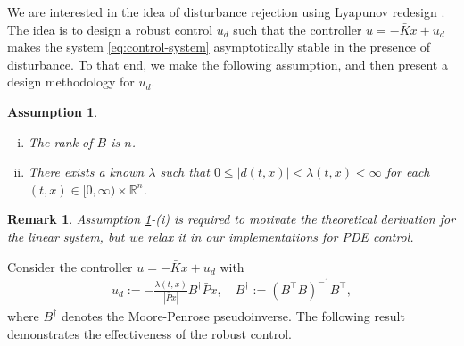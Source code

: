 \documentclass[10pt,a4paper]{amsart}
\newtheorem{assumption}{Assumption}
\newtheorem{remark}{Remark}
\newcommand{\tp}{^\top}
\newcommand{\inv}{^{-1}}
\newcommand{\R}{\mathbb{R}}
\newcommand{\ip}[2]{\langle #1, #2 \rangle}
\newcommand{\todo}[1]{{\color{blue} #1}}
\begin{document}
We are interested in the idea of disturbance rejection using Lyapunov redesign \cite[Chapter 14]{khalil}. The idea is to design a robust control $u_d$ such that the controller $u = -\bar{K}x + u_d$ makes the system \eqref{eq:control-system} asymptotically stable in the presence of disturbance. To that end, we make the following assumption, and then present a design methodology for $u_d$. %

\begin{assumption}
\begin{enumerate}[(i)]
    \item The rank of $B$ is $n$. 
    \item There exists a known $\lambda$ such that $0 \le |d(t,x)| < \lambda(t,x) < \infty$ for each $(t,x) \in [0,\infty) \times \R^n$.
\end{enumerate}
\label{assn:B}
\end{assumption}
\begin{remark} 
    Assumption \ref{assn:B}-(i) is required to motivate the theoretical derivation for the linear system, but we relax it in our implementations for PDE control. 
\end{remark}



Consider the controller $u = -\bar{K}x + u_d$ with 
\begin{align*}
    u_d := - \frac{\lambda(t,x)}{| \bar{P}x|} B^{\dagger} \bar{P}x, \quad B^{\dagger} := (B\tp B)\inv B\tp,
\end{align*}
where $B^{\dagger}$ denotes the Moore-Penrose pseudoinverse. 
The following result demonstrates the effectiveness of the robust control.
% 
% 
\end{document}
